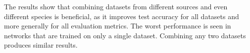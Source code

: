 The results show that combining datasets from different sources and even different species is beneficial, as it improves test accuracy for all datasets and more generally
for all evaluation metrics. The worst performance is seen in networks that are trained on only a single dataset. Combining any two datasets produces similar results.





































